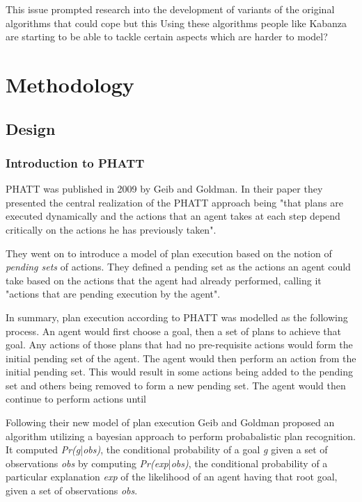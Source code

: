 \documentclass[parskip]{cs4rep}
\begin{document}
This issue prompted research into the development of variants of the original algorithms that could cope but this 
Using these algorithms people like Kabanza are starting to be able to tackle certain aspects which are harder to model?

\chapter{Methodology}

\section{Design}

\subsection{Introduction to PHATT}

PHATT was published in 2009 by Geib and Goldman. In their paper they presented the central realization of the PHATT approach being "that plans are executed dynamically and the actions that an agent takes at each step depend critically on the actions he has previously taken". 

They went on to introduce a model of plan execution based on the notion of \textit{pending sets} of actions. They defined a pending set as the actions an agent could take based on the actions that the agent had already performed, calling it "actions that are pending execution by the agent".

In summary, plan execution according to PHATT was modelled as the following process. An agent would first choose a goal, then a set of plans to achieve that goal. Any actions of those plans that had no pre-requisite actions would form the initial pending set of the agent. The agent would then perform an action from the initial pending set. This would result in some actions being added to the pending set and others being removed to form a new pending set. The agent would then continue to perform actions until

Following their new model of plan execution Geib and Goldman proposed an algorithm utilizing a bayesian approach to perform probabalistic plan recognition. It computed \textit{Pr(g}|\textit{obs)}, the conditional probability of a goal \textit{g} given a set of observations \textit{obs} by computing \textit{Pr(exp}|\textit{obs)}, the conditional probability of a particular explanation \textit{exp} of the likelihood of an agent having that root goal, given a set of observations \textit{obs}.
\end{document}
